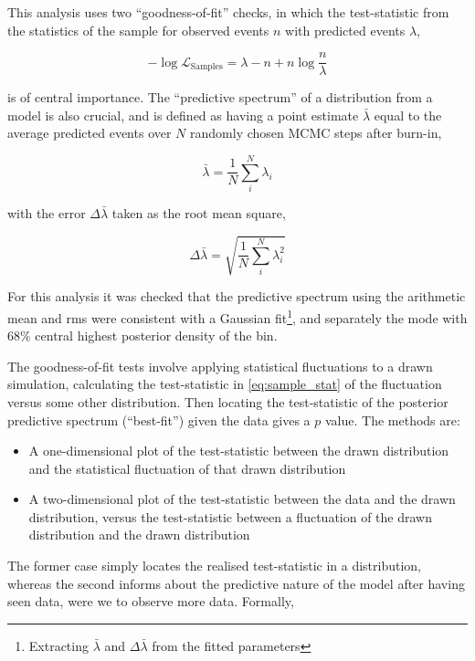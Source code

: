 This analysis uses two ``goodness-of-fit'' checks, in which the test-statistic from the statistics of the sample for observed events $n$ with predicted events $\lambda$,

\begin{equation}
	-\log\mathcal{L}_\text{Samples} = \lambda-n+n\log\frac{n}{\lambda}
	\label{eq:sample_stat}
\end{equation}

is of central importance. The ``predictive spectrum'' of a distribution from a model is also crucial, and is defined as having a point estimate $\bar{\lambda}$ equal to the average predicted events over $N$ randomly chosen MCMC steps after burn-in,

\begin{equation}
	\bar{\lambda} = \frac{1}{N} \sum^{N}_i \lambda_i
\end{equation}

with the error $\Delta \bar{\lambda}$ taken as the root mean square,

\begin{equation}
	\Delta \bar{\lambda} = \sqrt{\frac{1}{N} \sum^{N}_i \lambda^2_i}
\end{equation}

For this analysis it was checked that the predictive spectrum using the arithmetic mean and rms were consistent with a Gaussian fit\footnote{Extracting $\bar{\lambda}$ and $\Delta \bar{\lambda}$ from the fitted parameters}, and separately the mode with 68\% central highest posterior density of the bin.

The goodness-of-fit tests involve applying statistical fluctuations to a drawn simulation, calculating the test-statistic in \autoref{eq:sample_stat} of the fluctuation versus some other distribution. Then locating the test-statistic of the posterior predictive spectrum (``best-fit'') given the data gives a $p$ value. The methods are:

\begin{itemize} 
	\item A one-dimensional plot of the test-statistic between the drawn distribution and the statistical fluctuation of that drawn distribution
	\item A two-dimensional plot of the test-statistic between the data and the drawn distribution, versus the test-statistic between a fluctuation of the drawn distribution and the drawn distribution
\end{itemize}
The former case simply locates the realised test-statistic in a distribution, whereas the second informs about the predictive nature of the model after having seen data, were we to observe more data. Formally,

